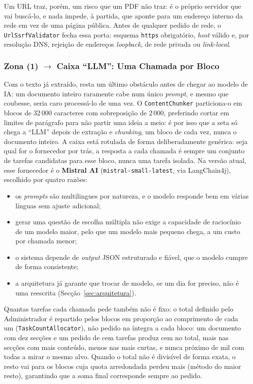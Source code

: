 Um URL traz, porém, um risco que um PDF não traz: é o próprio servidor que vai buscá-lo, e nada impede, à partida, que aponte para um endereço interno da rede em vez de uma página pública. Antes de qualquer pedido de rede, o \texttt{UrlSsrfValidator} fecha essa porta: esquema \texttt{https} obrigatório, \textit{host} válido e, por resolução DNS, rejeição de endereços \textit{loopback}, de rede privada ou \textit{link-local}. \label{sec:url} \label{sec:pdf} \label{sec:limites-ingestao}

\subsubsection*{Zona (1) $\to$ Caixa ``LLM'': Uma Chamada por Bloco}

Com o texto já extraído, resta um último obstáculo antes de chegar ao modelo de IA: um documento inteiro raramente cabe num único \textit{prompt}, e mesmo que coubesse, seria caro processá-lo de uma vez. O \texttt{ContentChunker} particiona-o em blocos de 32\,000 caracteres com sobreposição de 2\,000, preferindo cortar em limites de parágrafo para não partir uma ideia a meio: é por isso que a seta só chega a ``LLM'' depois de extração e \textit{chunking}, um bloco de cada vez, nunca o documento inteiro. A caixa está rotulada de forma deliberadamente genérica: seja qual for o fornecedor por trás, a resposta a cada chamada é sempre um conjunto de tarefas candidatas para esse bloco, nunca uma tarefa isolada. Na versão atual, esse fornecedor é o \textbf{Mistral AI} (\texttt{mistral-small-latest}, via LangChain4j), escolhido por quatro razões: \label{sec:ia-prompting}

\begin{itemize}
    \item os \textit{prompts} são multilingues por natureza, e o modelo responde bem em várias línguas sem ajuste adicional;
    \item gerar uma questão de escolha múltipla não exige a capacidade de raciocínio de um modelo maior, pelo que um modelo mais pequeno chega, a um custo por chamada menor;
    \item o sistema depende de \textit{output} JSON estruturado e fiável, que o modelo cumpre de forma consistente;
    \item a arquitetura já garante que trocar de modelo, se um dia for preciso, não é uma reescrita (Secção~\ref{sec:arquitetura}).
\end{itemize}

Quantas tarefas cada chamada pede também não é fixo: o total definido pelo Administrador é repartido pelos blocos em proporção ao comprimento de cada um (\texttt{TaskCountAllocator}), não pedido na íntegra a cada bloco: um documento com dez secções e um pedido de cem tarefas produz cem no total, mais nas secções com mais conteúdo, menos nas mais curtas, e nunca próximo de mil com todas a mirar o mesmo alvo. Quando o total não é divisível de forma exata, o resto vai para os blocos cuja quota arredondada perdeu mais (método do maior resto), garantindo que a soma final corresponde sempre ao pedido.

